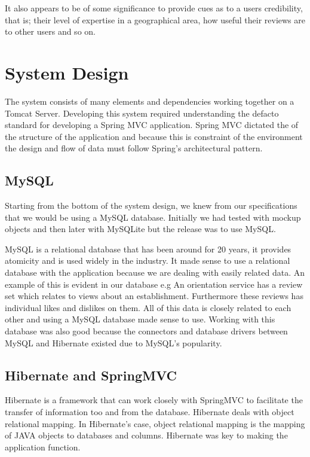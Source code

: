It also appears to be of some significance to provide cues as to a users credibility, that is; their level of expertise in a geographical area, how useful their reviews are to other users and so on\cite{Lopez}.


\chapter{System Design}

The system consists of many elements and dependencies working together on a Tomcat Server. Developing this system required understanding the defacto standard for developing a Spring MVC application. Spring MVC dictated the of the structure of the application and because this is constraint of the environment the design and flow of data must follow Spring's architectural pattern.

\section{MySQL}

Starting from the bottom of the system design, we knew from our specifications that we would be using a MySQL database. Initially we had tested with mockup objects and then later with MySQLite but the release was to use MySQL. 

MySQL is a relational database that has been around for 20 years, it provides atomicity and is used widely in the industry. It made sense to use a relational database with the application because we are dealing with easily related data. An example of this is evident in our database e.g An orientation service has a review set which relates to views about an establishment. Furthermore these reviews has individual likes and dislikes on them. All of this data is closely related to each other and using a MySQL database made sense to use. Working with this database was also good because the connectors and database drivers between MySQL and Hibernate existed due to MySQL's popularity.

\section{Hibernate and SpringMVC}

Hibernate is a framework that can work closely with SpringMVC to facilitate the transfer of information too and from the database. Hibernate deals with object relational mapping. In Hibernate's case, object relational mapping is the mapping of JAVA objects to databases and columns. Hibernate was key to making the application function.   






